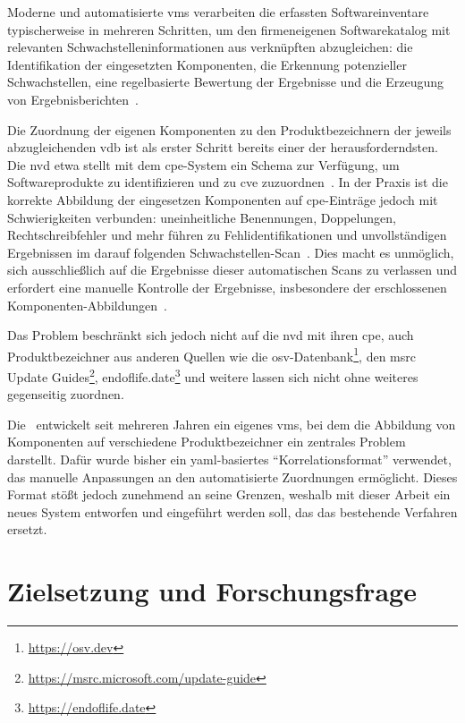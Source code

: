 Moderne und automatisierte \acrshort{vms} verarbeiten die erfassten Softwareinventare typischerweise in mehreren Schritten, um den firmeneigenen Softwarekatalog mit relevanten Schwachstelleninformationen aus verknüpften  abzugleichen:
die Identifikation der eingesetzten Komponenten, die Erkennung potenzieller Schwachstellen, eine regelbasierte Bewertung der Ergebnisse und die Erzeugung von Ergebnisberichten\ \autocite{Idrissi_Sebai_Faroukhi_Mahouachi_2024}.

Die Zuordnung der eigenen Komponenten zu den Produktbezeichnern der jeweils abzugleichenden \acrshort{vdb} ist als erster Schritt bereits einer der herausforderndsten.
Die \acrshort{nvd} etwa stellt mit dem \acrfull{cpe}-System ein Schema zur Verfügung, um Softwareprodukte zu identifizieren und zu \acrshort{cve} zuzuordnen\ \autocite{Cheikes_Waltermire_Scarfone_2011}.
In der Praxis ist die korrekte Abbildung der eingesetzen Komponenten auf \acrshort{cpe}-Einträge jedoch mit Schwierigkeiten verbunden:
uneinheitliche Benennungen, Doppelungen, Rechtschreibfehler und mehr führen zu Fehlidentifikationen und unvollständigen Ergebnissen im darauf folgenden Schwachstellen-Scan\ \autocite{Sanguino_Uetz_2017}.
Dies macht es unmöglich, sich ausschließlich auf die Ergebnisse dieser automatischen Scans zu verlassen und erfordert eine manuelle Kontrolle der Ergebnisse, insbesondere der erschlossenen Komponenten-Abbildungen\ \autocite{Sanguino_Uetz_2017}.

Das Problem beschränkt sich jedoch nicht auf die \acrshort{nvd} mit ihren \acrshort{cpe}, auch Produktbezeichner aus anderen Quellen wie die \acrfull{osv}-Datenbank\footnote{\url{https://osv.dev}}, den \acrfull{msrc} Update Guides\footnote{\url{https://msrc.microsoft.com/update-guide}}, endoflife.date\footnote{\url{https://endoflife.date}} und weitere lassen sich nicht ohne weiteres gegenseitig zuordnen.

Die \metaeffekt\ entwickelt seit mehreren Jahren ein eigenes \acrshort{vms}, bei dem die Abbildung von Komponenten auf verschiedene Produktbezeichner ein zentrales Problem darstellt.
Dafür wurde bisher ein \acrshort{yaml}-basiertes \enquote{Korrelationsformat} verwendet, das manuelle Anpassungen an den automatisierte Zuordnungen ermöglicht.
Dieses Format stößt jedoch zunehmend an seine Grenzen, weshalb mit dieser Arbeit ein neues System entworfen und eingeführt werden soll, das das bestehende Verfahren ersetzt.


\section{Zielsetzung und Forschungsfrage}\label{sec:ziel-forschungsfrage}

